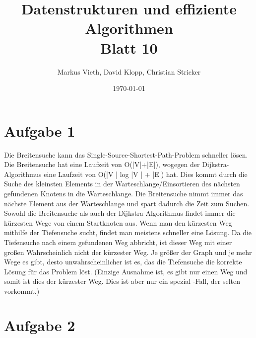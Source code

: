 \documentclass[a4paper,11pt,twoside]{article}
\title{Datenstrukturen und effiziente Algorithmen\\ Blatt 10}
\author{Markus Vieth, David Klopp, Christian Stricker}
\date{\today}
\begin{document}
\maketitle
\cleardoublepage
\pagestyle{myheadings}

\section*{Aufgabe 1}

Die Breitensuche kann das Single-Source-Shortest-Path-Problem schneller lösen. Die Breitensuche hat eine Laufzeit von O(|V|+|E|), wogegen der Dijkstra-Algorithmus eine Laufzeit von O(|V | log |V | + |E|) hat. Dies kommt durch die Suche des kleinsten Elements in der Warteschlange/Einsortieren des nächsten gefundenen Knotens in die Warteschlange. Die Breitensuche nimmt immer das nächste Element aus der Warteschlange und spart dadurch die Zeit zum Suchen. Sowohl die Breitensuche als auch der Dijkstra-Algorithmus findet immer die kürzesten Wege von einem Startknoten aus.
Wenn man den kürzesten Weg mithilfe der Tiefensuche sucht, findet man meistens schneller eine Lösung. Da die Tiefensuche nach einem gefundenen Weg abbricht, ist dieser Weg mit einer großen Wahrscheinlich nicht der kürzester Weg. Je größer der Graph und je mehr Wege es gibt, desto unwahrscheinlicher ist es, das die Tiefensuche die korrekte Lösung für das Problem löst. (Einzige Ausnahme ist, es gibt nur einen Weg und somit ist dies der kürzester Weg. Dies ist aber nur ein spezial -Fall, der selten vorkommt.) 


\section*{Aufgabe 2}
\end{document}
